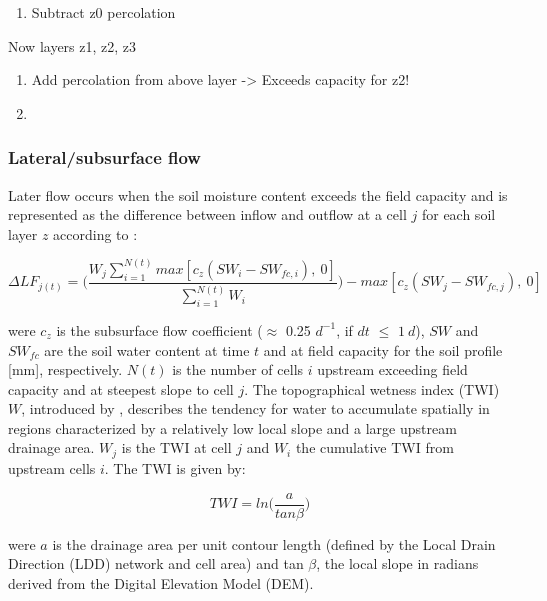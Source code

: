\documentclass[]{article}
\providecommand{\tightlist}{%
  \setlength{\itemsep}{0pt}\setlength{\parskip}{0pt}}
\begin{document}
\begin{enumerate}
\def\labelenumi{\arabic{enumi}.}
\setcounter{enumi}{1}
\tightlist
\item
  Subtract z0 percolation
\end{enumerate}

Now layers z1, z2, z3

\begin{enumerate}
\def\labelenumi{\arabic{enumi}.}
\item
  Add percolation from above layer -\textgreater{} Exceeds capacity for
  z2!
\item
\end{enumerate}

\subsubsection{Lateral/subsurface flow}\label{lateralsubsurface-flow}

Later flow occurs when the soil moisture content exceeds the field
capacity and is represented as the difference between inflow and outflow
at a cell \(j\) for each soil layer \(z\) according to
\cite{Manfreda2005}:

\begin{equation}
\Delta LF_{j(t)} = \Big( \frac{W_{j} \sum^{N(t)}_{i=1}max[c_{z}(SW_{i}-SW_{fc,i}),~0] }{ \sum^{N(t)}_{i=1} W_{i} } \Big) - max[c_z(SW_j-SW_{fc,j}),~0]
\label{eq:LF}  
\end{equation}

were \(c_z\) is the subsurface flow coefficient (\(\approx\) 0.25
\(d^{-1}\), if \(dt\) \(\leq\) \(1~d\)), \(SW\) and \(SW_{fc}\) are the
soil water content at time \(t\) and at field capacity for the soil
profile {[}mm{]}, respectively. \(N(t)\) is the number of cells \(i\)
upstream exceeding field capacity and at steepest slope to cell \(j\).
The topographical wetness index (TWI) \(W\), introduced by
\cite{Beven1979}, describes the tendency for water to accumulate
spatially in regions characterized by a relatively low local slope and a
large upstream drainage area. \(W_j\) is the TWI at cell \(j\) and
\(W_i\) the cumulative TWI from upstream cells \(i\). The TWI is given
by:

\begin{equation}
TWI =ln\Big(\frac{a}{tan \beta} \Big)
\label{eq:Wz}  
\end{equation}

were \(a\) is the drainage area per unit contour length (defined by the
Local Drain Direction (LDD) network and cell area) and tan \(\beta\),
the local slope in radians derived from the Digital Elevation Model
(DEM).
\end{document}
